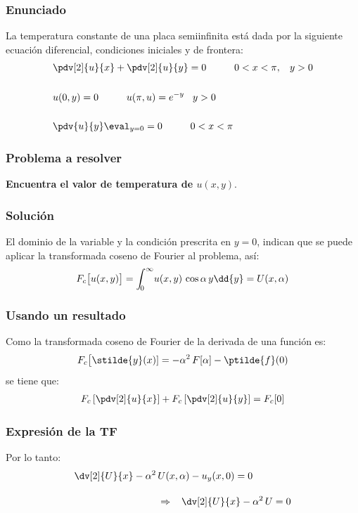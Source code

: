 \begin{frame}
\frametitle{Enunciado}
La temperatura constante de una placa semiinfinita está dada por la siguiente ecuación diferencial, condiciones iniciales y de frontera:
\begin{align*}
&\pdv[2]{u}{x} + \pdv[2]{u}{y} = 0 \hspace{1cm} 0 < x < \pi, \hspace{0.3cm} y > 0 \\[0.5cm]
&u(0, y) = 0 \hspace{1cm} u(\pi, u) = e^{-y} \hspace{0.3cm} y > 0 \\[0.5cm]
&\pdv{u}{y} \eval_{y=0} = 0 \hspace{1cm} 0 < x < \pi
\end{align*}
\end{frame}
\begin{frame}
\frametitle{Problema a resolver}
\textbf{Encuentra el valor de temperatura de $u(x,y)$}.
\end{frame}
\begin{frame}
\frametitle{Solución}
El dominio de la variable y la condición prescrita en $y = 0$, indican que se puede aplicar la transformada coseno de Fourier al problema, así:
\begin{align*}
F_{c} \big[u(x,y)\big] = \scaleint{5ex}_{\bs 0}^{\infty} u(x, y) \, \cos \alpha \, y \dd{y} = U(x, \alpha)
\end{align*}
\end{frame}
\begin{frame}
\frametitle{Usando un resultado}
Como la transformada coseno de Fourier de la derivada de una función es:
\begin{align*}
F_{c} \big[\stilde{y}(x)] = - \alpha^{2} \, F[\alpha] - \ptilde{f} (0)
\end{align*}
se tiene que:
\begin{align*}
F_{c} \left[\pdv[2]{u}{x} \right] + F_{c} \left[\pdv[2]{u}{y} \right] = F_{c} [0]
\end{align*}
\end{frame}
\begin{frame}
\frametitle{Expresión de la TF}
Por lo tanto:
\begin{align*}
\dv[2]{U}{x} - \alpha^{2} \, &U(x, \alpha) - u_{y} (x, 0) = 0 \\[1em]
&\Rightarrow \hspace{0.3cm} \dv[2]{U}{x} - \alpha^{2} \, U = 0
\end{align*}
\end{frame}
